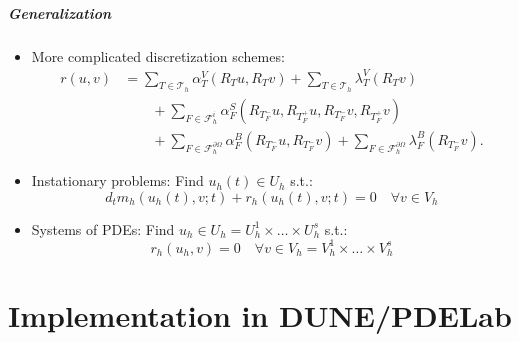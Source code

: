 \documentclass[aspectratio=169,11pt]{beamer}
\theoremstyle{definition}
\begin{document}
\begin{frame}
\frametitle{Generalization}
\begin{itemize}
\item More complicated discretization schemes:
\begin{equation*}
\begin{split}
r(u,v) &=
\sum_{T\in\mathcal{T}_h} \alpha_T^V(R_T u, R_T v)
+ \sum_{T\in\mathcal{T}_h} \lambda_T^V(R_T v) \\
&\qquad+ \sum_{F\in\mathcal{F}_h^i} \alpha_F^S(R_{T_F^-} u,R_{T_F^+} u, R_{T_F^-} v, R_{T_F^+} v)\\
&\qquad+ \sum_{F\in\mathcal{F}_h^{\partial\Omega}} \alpha_F^B(R_{T_F^-} u, R_{T_F^-} v)
+ \sum_{F\in\mathcal{F}_h^{\partial\Omega}} \lambda_F^B(R_{T_F^-} v) .
\end{split}
\end{equation*}
\item Instationary problems: Find $u_h(t)\in U_h$ s.t.:
\begin{equation*}
d_t m_h(u_h(t),v;t) + r_h(u_h(t),v;t) = 0
\quad \forall v\in V_h
\end{equation*}
\item Systems of PDEs: Find $u_h\in U_h=U_h^1\times \ldots \times U_h^s$ s.t.:
\begin{equation*}
r_h(u_h,v)=0
\quad \forall v\in V_h=V_h^1\times\ldots\times V_h^s
\end{equation*}
\end{itemize}
\end{frame}


\part{Implementation in DUNE/PDELab}
\begin{frame}
  \partpage
\end{frame}
\end{document}
